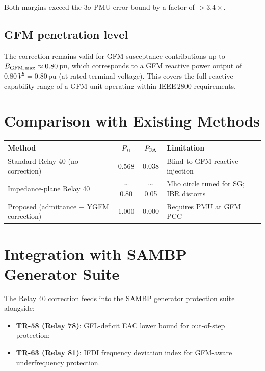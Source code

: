 \documentclass[11pt,a4paper]{article}
\begin{document}
Both margins exceed the $3\sigma$ PMU error bound by a factor of $> 3.4\times$.

\subsection{GFM penetration level}

The correction remains valid for GFM susceptance contributions up to
$B_{\rm GFM,max} \approx 0.80$\,pu, which corresponds to a GFM reactive power
output of $0.80\,V^2 = 0.80$\,pu (at rated terminal voltage).  This covers
the full reactive capability range of a GFM unit operating within IEEE\,2800
requirements.

\section{Comparison with Existing Methods}
\label{sec:comparison}

\begin{center}
\begin{tabular}{p{}ccp{}}
  \toprule
  Method & $P_D$ & $P_{\rm FA}$ & Limitation \\
  \midrule
  Standard Relay 40 (no correction) \cite{IEEE_C37_102}
    & 0.568 & 0.038 & Blind to GFM reactive injection \\
  Impedance-plane Relay 40 \cite{Reimert2006}
    & $\sim$0.80 & $\sim$0.05 & Mho circle tuned for SG; IBR distorts \\
  Proposed (admittance + YGFM correction)
    & 1.000 & 0.000 & Requires PMU at GFM PCC \\
  \bottomrule
\end{tabular}
\end{center}

\section{Integration with SAMBP Generator Suite}
\label{sec:integration}

The Relay 40 correction feeds into the SAMBP generator protection suite
alongside:
\begin{itemize}
  \item \textbf{TR-58 (Relay 78)}: GFL-deficit EAC lower bound for out-of-step
        protection;
  \item \textbf{TR-63 (Relay 81)}: IFDI frequency deviation index for GFM-aware
        underfrequency protection.
\end{itemize}
\end{document}
